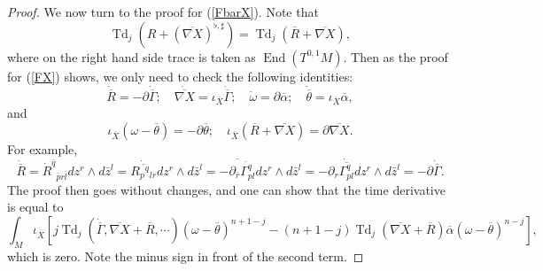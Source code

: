 \documentclass[10pt,a4paper]{amsart}
\DeclareMathOperator{\End}{End}
\DeclareMathOperator{\Td}{Td}
\def\a{\alpha}
\def\bl{\bar l}
\def\br{\bar r}
\def\p{\partial}
\begin{document}
\begin{proof}
We now turn to the proof for (\ref{FbarX}). Note that 
\begin{equation*}
\Td_j(R+(\overline{\nabla X})^{\flat,\sharp})=\Td_j(\overline{R}+\overline{\nabla X}),
\end{equation*}
where on the right hand side trace is taken as $\End(T^{0,1}M)$.
Then as the proof for (\ref{FX}) shows, we only need to check the following identities:
\begin{equation*}
\dot{\overline{R}}=-\p \dot{\overline{\Gamma}};\quad \dot{\overline{\nabla X}}=\iota_{\overline{X}} \dot{\overline{\Gamma}};\quad \dot{\omega}=\p \overline{\alpha};\quad \dot{\overline{\theta}}=\iota_{\overline{X}}\overline{\alpha},
\end{equation*}
and
\begin{equation*}
\iota_{\overline{X}} (\omega-\overline{\theta})= -\p\overline{\theta};\quad 
\iota_{\overline{X}} (\overline{R}+\overline{\nabla X})=\p \overline{\nabla X}.
\end{equation*}
For example,
\begin{equation*}
\dot{\overline{R}}=\dot{R}^{\bar{q}}{}_{\bar{p}r\bl}dz^r\wedge d\bar{z}^l=\dot{\overline{R_{p}{}^{q}{}_{l \overline{r} } }}dz^r\wedge d\bar{z}^l=\overline{ -\p_{\br} \dot{\Gamma^{q}_{pl}}}dz^r\wedge d\bar{z}^l=-\p_r \dot{\overline{\Gamma^{q}_{pl}}}dz^r\wedge d\bar{z}^l=-\p\dot{\overline{\Gamma}}.
\end{equation*}
The proof then goes without changes, and one can show that the time derivative is equal to 
\begin{equation*}
\int_M \iota_{\overline{X}} \left[j\Td_j(\dot{\overline{\Gamma}},\overline{\nabla X}+\overline{R},\cdots)(\omega-\overline{\theta})^{n+1-j}-(n+1-j)\Td_j(\overline{\nabla X}+\overline{R})\overline{\a}(\omega-\overline{\theta})^{n-j} \right],
\end{equation*}
which is zero. Note the minus sign in front of the second term.
\end{proof}
\end{document}
